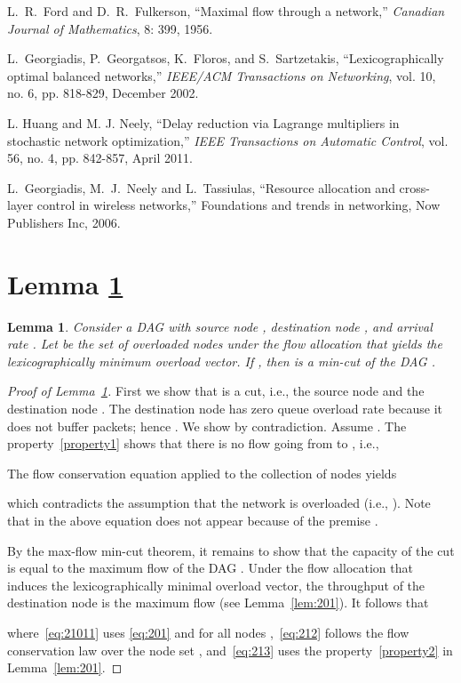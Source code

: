 \documentclass{sig-alternate-2013}
\newtheorem{lemma}{Lemma}
\begin{document}
\begin{thebibliography}{99}
L.~R.~Ford and D.~R.~Fulkerson, ``Maximal flow through a network,'' \emph{Canadian Journal of Mathematics}, 8: 399, 1956.

 L.~Georgiadis, P.~Georgatsos, K.~Floros, and S.~Sartzetakis, ``Lexicographically optimal balanced networks,'' \emph{IEEE/ACM Transactions on Networking}, vol.
10, no. 6, pp. 818-829, December 2002.

 L. Huang and M. J. Neely, ``Delay reduction via Lagrange multipliers in stochastic network optimization,'' \emph{IEEE Transactions on Automatic Control}, vol. 56, no. 4, pp. 842-857, April 2011.

 L.~Georgiadis, M.~J.~Neely and L.~Tassiulas, ``Resource allocation and cross-layer control in wireless networks,'' 
Foundations and trends in networking, Now Publishers Inc, 2006.



\end{thebibliography}



\appendix

\section{Lemma \ref{MIN-CUT}}\label{app:A}
\begin{lemma}\label{MIN-CUT}
Consider a DAG  with source node , destination node , and arrival rate . Let  be the set of overloaded nodes under the flow allocation  that yields the lexicographically minimum overload vector. If , then  is a min-cut of the DAG .
\end{lemma}
\begin{proof}[Proof of Lemma~\ref{MIN-CUT}]
First we show that  is a cut, i.e., the source node   and the destination node . The destination node  has zero queue overload rate  because it does not buffer packets; hence . We show  by contradiction. Assume .  The property~\eqref{property1} shows that there is no flow going from  to , i.e., 

The flow conservation equation applied to the collection  of nodes yields

which contradicts the assumption that the network is overloaded (i.e., ). Note that in the above equation  does not appear because of the premise .

By the max-flow min-cut theorem, it remains to show that the capacity of the cut  is equal to the maximum flow  of the DAG . Under the flow allocation  that induces the lexicographically minimal overload vector, the throughput of the destination node  is the maximum flow  (see Lemma~\ref{lem:201}). It follows that

where~\eqref{eq:21011} uses \eqref{eq:201} and  for all nodes ,~\eqref{eq:212} follows the flow conservation law over the node set , and~\eqref{eq:213} uses the property~\eqref{property2} in Lemma~\ref{lem:201}.
\end{proof}
\end{document}
